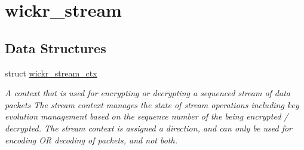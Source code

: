 \hypertarget{group__wickr__stream}{}\section{wickr\+\_\+stream}
\label{group__wickr__stream}
\subsection*{Data Structures}
\begin{DoxyCompactItemize}
\item 
struct \mbox{\hyperlink{structwickr__stream__ctx}{wickr\+\_\+stream\+\_\+ctx}}
\begin{DoxyCompactList}\small\item\em A context that is used for encrypting or decrypting a sequenced stream of data packets The stream context manages the state of stream operations including key evolution management based on the sequence number of the being encrypted / decrypted. The stream context is assigned a direction, and can only be used for encoding OR decoding of packets, and not both. \end{DoxyCompactList}\end{DoxyCompactItemize}
